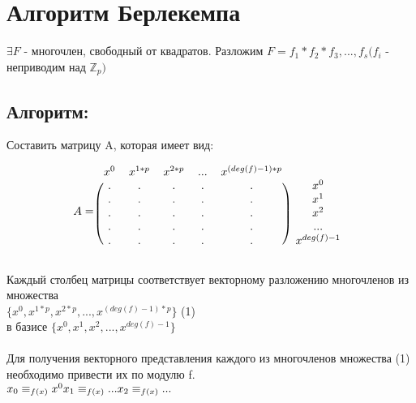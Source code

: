 \documentclass[12pt]{article}
\begin{document}
\section{Алгоритм Берлекемпа}
$\exists F$ - многочлен, свободный от квадратов. Разложим $F = f_1 * f_2 * f_3, ..., f_s (f_i$ - неприводим над $\mathbb{Z}_p )$
\subsection {Алгоритм:}
Составить матрицу A, которая имеет вид:

\[
A = 
\begin{blockarray}{cccccc}
x^0 & x^{1*p} & x^{2*p} & ... & x^{(deg(f) - 1)*p} \\
\begin{block}{(ccccc)c}
  . & . & . & . & . & x^0 \\
  . & . & . & . & . & x^1 \\
  . & . & . & . & . & x^2 \\
  . & . & . & . & . & ... \\
  . & . & . & . & . & x^{deg(f)-1} \\
\end{block}
\end{blockarray}
 \]
 
Каждый столбец матрицы соответствует векторному разложению многочленов из множества \\
$\{x^0, x^{1*p}, x^{2*p}, ..., x^{(deg(f)-1)*p}\}$ \hspace{0,5cm} (1)\\
в базисе $\{x^0, x^1, x^2, ..., x^{deg(f)-1}\}$\\\\
Для получения векторного представления каждого из многочленов множества (1) необходимо привести их по модулю f.\\
$x_0 \equiv_{f(x)} x^0\\
x_1 \equiv_{f(x)}...\\
x_2 \equiv_{f(x)}...$\\
\end{document}
